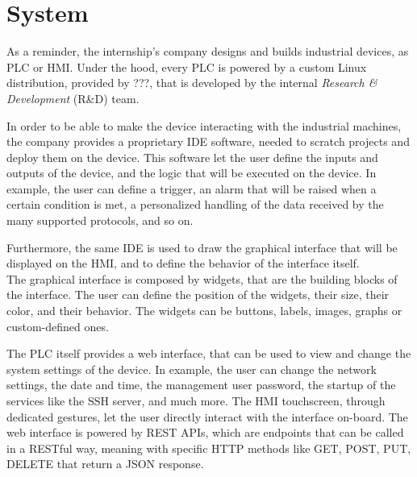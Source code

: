 \chapter{System}



As a reminder, the internship's company designs and builds industrial devices, as PLC or HMI. Under the hood, every PLC is powered by a custom Linux distribution, provided by ???, that is developed by the internal \textit{Research \& Development} (R\&D) team.

In order to be able to make the device interacting with the industrial machines, the company provides a proprietary IDE software, needed to scratch projects and deploy them on the device. This software let the user define the inputs and outputs of the device, and the logic that will be executed on the device. In example, the user can define a trigger, an alarm that will be raised when a certain condition is met, a personalized handling of the data received by the many supported protocols, and so on.

Furthermore, the same IDE is used to draw the graphical interface that will be displayed on the HMI, and to define the behavior of the interface itself.\\
The graphical interface is composed by widgets, that are the building blocks of the interface. The user can define the position of the widgets, their size, their color, and their behavior. The widgets can be buttons, labels, images, graphs or custom-defined ones.

The PLC itself provides a web interface, that can be used to view and change the system settings of the device. In example, the user can change the network settings, the date and time, the management user password, the startup of the services like the SSH server, and much more. The HMI touchscreen, through dedicated gestures, let the user directly interact with the interface on-board. The web interface is powered by REST APIs, which are endpoints that can be called in a RESTful way, meaning with specific HTTP methods like GET, POST, PUT, DELETE that return a JSON response.

